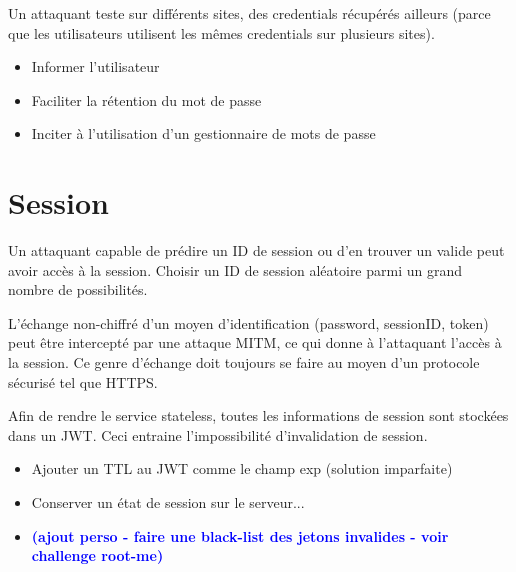 \documentclass[a4paper]{article}
\begin{document}
\begin{attaque}
    Un attaquant teste sur différents sites, des credentials récupérés ailleurs (parce que les utilisateurs utilisent les mêmes credentials sur plusieurs sites).
    \begin{itemize}
        \item Informer l’utilisateur
        \item Faciliter la rétention du mot de passe
        \item Inciter à l’utilisation d’un gestionnaire de mots de passe
    \end{itemize}
\end{attaque}















\section{Session}





\begin{attaque}
    Un attaquant capable de prédire un ID de session ou d’en trouver un valide peut avoir accès à la session.
    Choisir un ID de session aléatoire parmi un grand nombre de possibilités.
\end{attaque}

\begin{attaque}
    L'échange non-chiffré d’un moyen d’identification (password, sessionID, token) peut être intercepté par une attaque MITM, ce qui donne à l’attaquant l’accès à la session.
    Ce genre d’échange doit toujours se faire au moyen d’un protocole sécurisé tel que HTTPS.
\end{attaque}

\begin{mauvaisepratique}
    Afin de rendre le service stateless, toutes les informations de session sont stockées dans un JWT. Ceci entraine l’impossibilité d’invalidation de session.
    \begin{itemize}
        \item Ajouter un TTL au JWT comme le champ exp (solution imparfaite)
        \item Conserver un état de session sur le serveur...
        \item \textcolor{blue}{\textbf{(ajout perso - faire une black-list des jetons invalides - voir challenge root-me)}}
    \end{itemize}
\end{mauvaisepratique}
\end{document}
